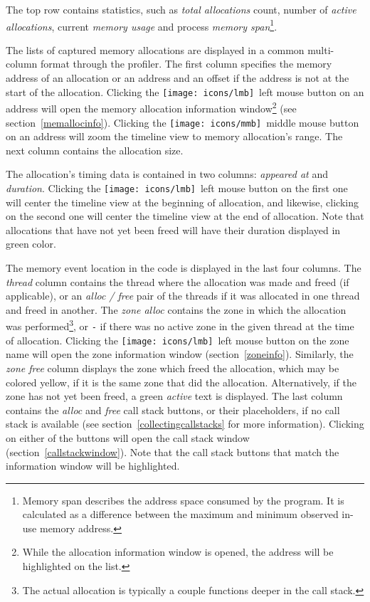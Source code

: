 \documentclass[hidelinks,titlepage,a4paper,twoside]{article}
\newcommand{\LMB}{\texttt{[image: icons/lmb]}}
\newcommand{\MMB}{\texttt{[image: icons/mmb]}}
\begin{document}
The top row contains statistics, such as \emph{total allocations} count, number of \emph{active allocations}, current \emph{memory usage} and process \emph{memory span}\footnote{Memory span describes the address space consumed by the program. It is calculated as a difference between the maximum and minimum observed in-use memory address.}.

The lists of captured memory allocations are displayed in a common multi-column format through the profiler. The first column specifies the memory address of an allocation or an address and an offset if the address is not at the start of the allocation. Clicking the \LMB{}~left mouse button on an address will open the memory allocation information window\footnote{While the allocation information window is opened, the address will be highlighted on the list.} (see section~\ref{memallocinfo}). Clicking the \MMB{}~middle mouse button on an address will zoom the timeline view to memory allocation's range. The next column contains the allocation size.

The allocation's timing data is contained in two columns: \emph{appeared at} and \emph{duration}. Clicking the \LMB{}~left mouse button on the first one will center the timeline view at the beginning of allocation, and likewise, clicking on the second one will center the timeline view at the end of allocation. Note that allocations that have not yet been freed will have their duration displayed in green color.

The memory event location in the code is displayed in the last four columns. The \emph{thread} column contains the thread where the allocation was made and freed (if applicable), or an \emph{alloc / free} pair of the threads if it was allocated in one thread and freed in another. The \emph{zone alloc} contains the zone in which the allocation was performed\footnote{The actual allocation is typically a couple functions deeper in the call stack.}, or \texttt{-} if there was no active zone in the given thread at the time of allocation. Clicking the \LMB{}~left mouse button on the zone name will open the zone information window (section~\ref{zoneinfo}). Similarly, the \emph{zone free} column displays the zone which freed the allocation, which may be colored yellow, if it is the same zone that did the allocation. Alternatively, if the zone has not yet been freed, a green \emph{active} text is displayed. The last column contains the \emph{alloc} and \emph{free} call stack buttons, or their placeholders, if no call stack is available (see section~\ref{collectingcallstacks} for more information). Clicking on either of the buttons will open the call stack window (section~\ref{callstackwindow}). Note that the call stack buttons that match the information window will be highlighted.
\end{document}
